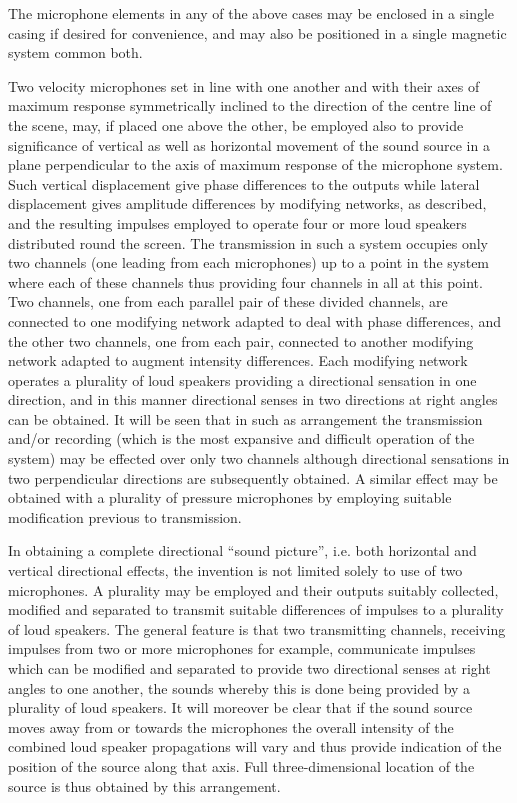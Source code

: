 \documentclass[11pt]{article}
\begin{document}
\begin{multicols*}{2}
The microphone elements in any of the above cases may be enclosed in a single casing if desired for convenience, and may also be positioned in a single magnetic system common both.

Two velocity microphones set in line with one another and with their axes of maximum response symmetrically inclined to the direction of the centre line of the scene, may, if placed one above the other, be employed also to provide significance of vertical as well as horizontal movement of the sound source in a plane perpendicular to the axis of maximum response of the microphone system. Such vertical displacement give phase differences to the outputs while lateral displacement gives amplitude differences by modifying networks, as described, and the resulting impulses employed to operate four or more loud speakers distributed round the screen. The transmission in such a system occupies only two channels (one leading from each microphones) up to a point in the system where each of these channels thus providing four channels in all at this point. Two channels, one from each parallel pair of these divided channels, are connected to one modifying network adapted to deal with phase differences, and the other two channels, one from each pair, connected to another modifying network adapted to augment intensity differences. Each modifying network operates a plurality of loud speakers providing a directional sensation in one direction, and in this manner directional senses in two directions at right angles can be obtained. It will be seen that in such as arrangement the transmission and/or recording (which is the most expansive and difficult operation of the system) may be effected over only two channels although directional sensations in two perpendicular directions are subsequently obtained. A similar effect may be obtained with a plurality of pressure microphones by employing suitable modification previous to transmission.

In obtaining a complete directional “sound picture”, i.e. both horizontal and vertical directional effects, the invention is not limited solely to use of two microphones. A plurality may be employed and their outputs suitably collected, modified and separated to transmit suitable differences of impulses to a plurality of loud speakers. The general feature is that two transmitting channels, receiving impulses from two or more microphones for example, communicate impulses which can be modified and separated to provide two directional senses at right angles to one another, the sounds whereby this is done being provided by a plurality of loud speakers. It will moreover be clear that if the sound source moves away from or towards the microphones the overall intensity of the combined loud speaker propagations will vary and thus provide indication of the position of the source along that axis. Full three-dimensional location of the source is thus obtained by this arrangement.


\end{multicols*}
\end{document}
